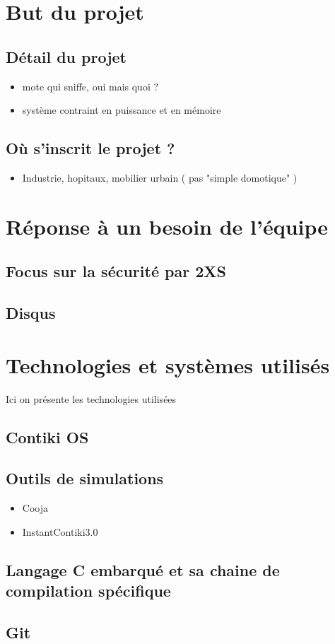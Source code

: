\section{But du projet}

	\subsection{Détail du projet}
		\begin{itemize}
			\item mote qui sniffe, oui mais quoi ?
			\item système contraint en puissance et en mémoire
		\end{itemize}
	\subsection{Où s'inscrit le projet ?}
		\begin{itemize}
			\item Industrie, hopitaux, mobilier urbain ( pas "simple domotique" )
		\end{itemize}

\section{Réponse à un besoin de l'équipe}
	
	\subsection{Focus sur la sécurité par 2XS}
	
	\subsection{Disqus}

\section{Technologies et systèmes utilisés}
	Ici on présente les technologies utilisées
	\subsection{Contiki OS}
	\subsection{Outils de simulations}
		\begin{itemize}
			\item Cooja
			\item InstantContiki3.0
		\end{itemize}
	\subsection{Langage C embarqué et sa chaine de compilation spécifique}
	\subsection{Git}
